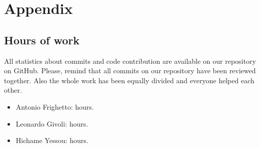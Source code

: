\chapter*{Appendix}

\section*{Hours of work}
All statistics about commits and code contribution are available on our repository on GitHub. Please, remind that all commits on our repository have been reviewed together. Also the whole work has been equally divided and everyone helped each other.

\begin{itemize}
    \item Antonio Frighetto:  hours.
    \item Leonardo Givoli:  hours.
    \item Hichame Yessou:  hours.
\end{itemize}